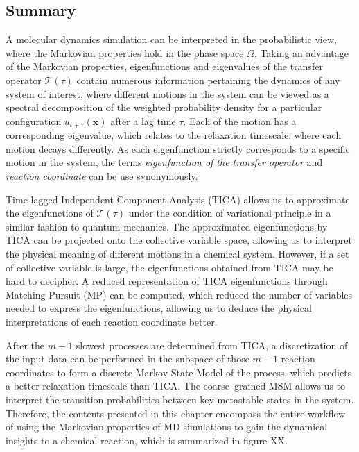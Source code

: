 \begin{spacing}{2.0}
    \section{Summary}

    A molecular dynamics simulation can be interpreted in the probabilistic view, where the Markovian properties hold in the phase space $\Omega$.
    Taking an advantage of the Markovian properties, eigenfunctions and eigenvalues of the transfer operator $\mathcal{T}(\tau)$ contain numerous
    information pertaining the dynamics of any system of interest, where different motions in the system can be viewed as a spectral decomposition
    of the weighted probability density for a particular configuration $u_{t+\tau}(\mathbf{x})$ after a lag time $\tau$. Each of the motion has
    a corresponding eigenvalue, which relates to the relaxation timescale, where each motion decays differently. As each eigenfunction strictly
    corresponds to a specific motion in the system, the terms \textsl{eigenfunction of the transfer operator} and \textsl{reaction coordinate}
    can be use synonymously.

    Time-lagged Independent Component Analysis (TICA) allows us to approximate the eigenfunctions of $\mathcal{T}(\tau)$ under the condition of
    variational principle in a similar fashion to quantum mechanics. The approximated eigenfunctions by TICA can be projected onto the collective
    variable space, allowing us to interpret the physical meaning of different motions in a chemical system. However, if a set of collective
    variable is large, the eigenfunctions obtained from TICA may be hard to decipher. A reduced representation of TICA eigenfunctions through
    Matching Pursuit (MP) can be computed, which reduced the number of variables needed to express the eigenfunctions, allowing us to deduce
    the physical interpretations of each reaction coordinate better.

    After the $m-1$ slowest processes are determined from TICA, a discretization of the input data can be performed in the subspace of those
    $m-1$ reaction coordinates to form a discrete Markov State Model of the process, which predicts a better relaxation timescale than TICA.
    The coarse--grained MSM allows us to interpret the transition probabilities between key metastable states in the system. Therefore, the
    contents presented in this chapter encompass the entire workflow of using the Markovian properties of MD simulations to gain the dynamical
    insights to a chemical reaction, which is summarized in figure XX.

\end{spacing}
